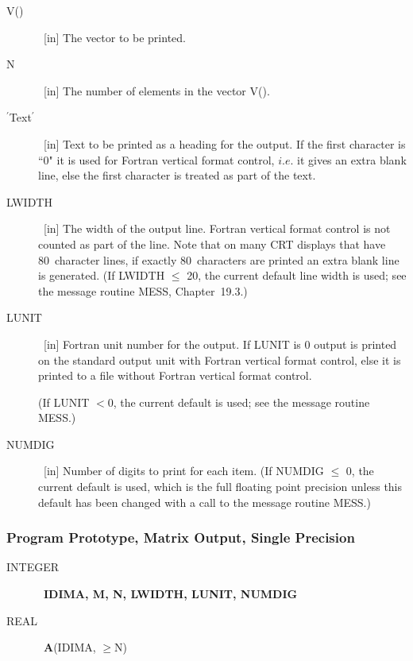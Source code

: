 \documentclass[twoside]{MATH77}
\begin{document}
\begin{description}

\item[V()] \ [in] The vector to be printed.

\item[N] \ [in] The number of elements in the vector V().

\item[$^{\prime}$Text$^{\prime}$] \ [in] Text to be printed as a heading
for the output.  If the first character is ``0" it is used for Fortran vertical
format control, $i.e$. it gives an extra blank line, else the first
character is treated as part of the text.

\item[LWIDTH] \ [in] The width of the output line. Fortran vertical format
control is not counted as part of the line. Note that on many CRT displays
that have 80~character lines, if exactly 80~characters are printed an extra
blank line is generated. (If LWIDTH $\leq$ 20, the current default line width
is used; see the message routine MESS, Chapter~19.3.)

\item[LUNIT] \ [in] Fortran unit number for the output. If LUNIT is 0 output is
printed on the standard output unit with Fortran vertical format control,
else it is printed to a file without Fortran vertical format control.

(If LUNIT $< 0$, the current default is used; see the message routine
MESS.)

\item[NUMDIG] \ [in] Number of digits to print for each item.
(If NUMDIG $\leq $ 0, the current default is used, which is the full
floating point precision unless this default has been changed with a call
to the message routine MESS.)

\end{description}

\subsubsection{Program Prototype, Matrix Output, Single Precision}

\begin{description}

\item[INTEGER] \ {\bf IDIMA, M, N, LWIDTH, LUNIT, NUMDIG}

\item[REAL] \ {\bf A}(IDIMA, $\geq $N)

\end{description}
\end{document}
